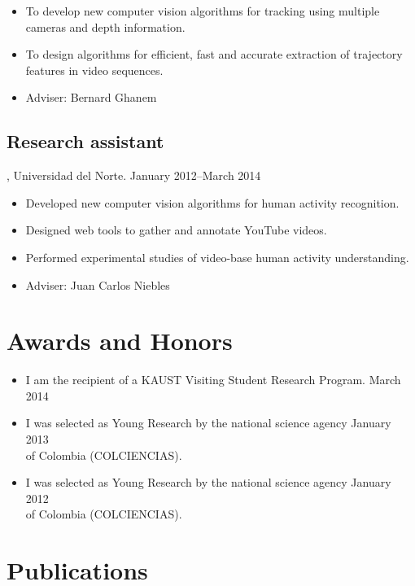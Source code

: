 \documentclass[letterpaper,10pt]{article}
\begin{document}
\begin{itemize}
  \item To develop new computer vision algorithms for tracking using multiple cameras and depth information.  
  \item To design algorithms for efficient, fast and accurate extraction of trajectory features in video sequences.  
  \item Adviser:  Bernard Ghanem
\end{itemize}

\subsection{Research assistant}, Universidad del Norte. \hfill January 2012--March 2014

\begin{itemize}
  \item Developed new computer vision algorithms for human activity recognition.
  \item Designed web tools to gather and annotate YouTube videos.
  \item Performed experimental studies of video-base human activity understanding.
  \item Adviser:  Juan Carlos Niebles
\end{itemize}

\section{Awards and Honors}

\begin{itemize}
  \item I am the recipient of a KAUST Visiting Student Research Program. \hfill March 2014
  \item I was selected as Young Research by the national science agency \hfill January 2013 \\
  of Colombia (COLCIENCIAS). 
  \item I was selected as Young Research by the national science agency \hfill January 2012 \\
  of Colombia (COLCIENCIAS).
\end{itemize}

\pagebreak


\section{Publications}
\end{document}
